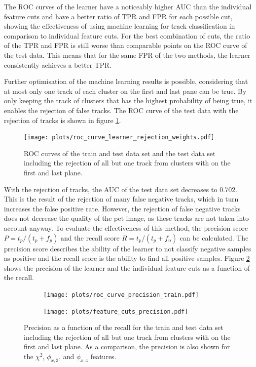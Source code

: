 The ROC curves of the learner have a noticeably higher AUC than the individual feature cuts and have a better ratio of TPR and FPR for each possible cut, showing the effectiveness
of using machine learning for track classification in comparison to individual feature cuts. For the best combination of cuts, the ratio of the TPR and FPR is still worse than
comparable points on the ROC curve of the test data. This means that for the same FPR of the two methods, the learner consistently achieves a better TPR.

Further optimisation of the machine learning results is possible, considering that at most only one track of each cluster
on the first and last pane can be true. By only keeping the track of clusters that has the highest probability of being true, it enables the rejection of
false tracks. The ROC curve of the test data with the rejection of tracks is shown in figure \ref{fig:rejection}.


\begin{figure}
  \centering
  \texttt{[image: plots/roc\_curve\_learner\_rejection\_weights.pdf]}
  \caption{ROC curves of the train and test data set and the test data set including the rejection of all but one track from clusters with on the first and last plane.}
  \label{fig:rejection}
\end{figure}

With the rejection of tracks, the AUC of the test data set decreases to $0.702$. This is the result of the rejection of many false negative tracks, which in turn increases
the false positive rate. However, the rejection of false negative tracks does not decrease the quality of the pct image, as these tracks are not taken into account anyway.
To evaluate the effectiveness of this method, the precision score $P=t_p/(t_p + f_p)$ and the recall score $R=t_p/(t_p + f_n)$ can be calculated. The precision
score describes the ability of the learner to not classify negative samples as positive and the recall score is the ability to find all positive samples.
Figure \ref{fig:precision} shows the precision of the learner and the individual feature cuts as a function of the recall.

\begin{figure}
  \hspace{-1cm}
  \begin{subfigure}{0.53\textwidth}
      \centering
      \texttt{[image: plots/roc\_curve\_precision\_train.pdf]}
  \end{subfigure}
  \begin{subfigure}{0.53\textwidth}
      \texttt{[image: plots/feature\_cuts\_precision.pdf]}
  \end{subfigure}
  \caption{Precision as a function of the recall for the train and test data set including the rejection of all but one track from clusters with on the first and last
           plane. As a comparison, the precision is also shown for the $\chi^2$, $\phi_{x,3}$, and $\phi_{x,4}$ features.}
  \label{fig:precision}
\end{figure}

